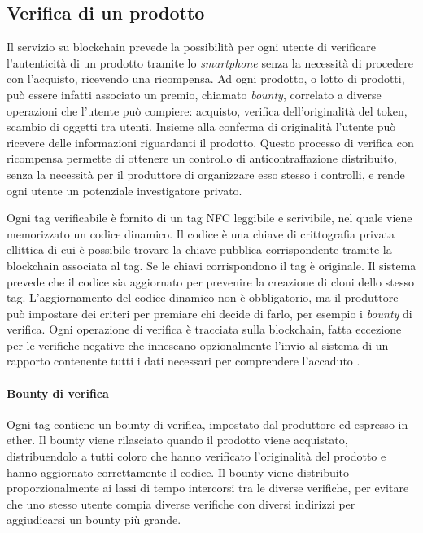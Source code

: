 \subsection{Verifica di un prodotto}
\label{verifica-di-un-prodotto}
Il servizio su blockchain prevede la possibilità per ogni utente di verificare l'autenticità di un prodotto tramite lo \emph{smartphone} senza la necessità di procedere con l'acquisto, ricevendo una ricompensa. Ad ogni prodotto, o lotto di prodotti, può essere infatti associato un premio, chiamato \emph{bounty}, correlato a diverse operazioni che l'utente può compiere: acquisto, verifica dell'originalità del token, scambio di oggetti tra utenti. Insieme alla conferma di originalità l'utente può ricevere delle informazioni riguardanti il prodotto. Questo processo di verifica con ricompensa permette di ottenere un controllo di anticontraffazione distribuito, senza la necessità per il produttore di organizzare esso stesso i controlli, e rende ogni utente un potenziale investigatore privato.

Ogni tag verificabile è fornito di un tag NFC leggibile e scrivibile, nel quale viene memorizzato un codice dinamico. Il codice è una chiave di crittografia privata ellittica di cui è possibile trovare la chiave pubblica corrispondente tramite la blockchain associata al tag. Se le chiavi corrispondono il tag è originale. Il sistema prevede che il codice sia aggiornato per prevenire la creazione di cloni dello stesso tag. L'aggiornamento del codice dinamico non è obbligatorio, ma il produttore può impostare dei criteri per premiare chi decide di farlo, per esempio i \emph{bounty} di verifica. Ogni operazione di verifica è tracciata sulla blockchain, fatta eccezione per le verifiche negative che innescano opzionalmente l'invio al sistema di un rapporto contenente tutti i dati necessari per comprendere l'accaduto \cite{bCerty-whitepaper}.

\paragraph{Bounty di verifica}
Ogni tag contiene un bounty di verifica, impostato dal produttore ed espresso in ether. Il bounty viene rilasciato quando il prodotto viene acquistato, distribuendolo a tutti coloro che hanno verificato l'originalità del prodotto e hanno aggiornato correttamente il codice. Il bounty viene distribuito proporzionalmente ai lassi di tempo intercorsi tra le diverse verifiche, per evitare che uno stesso utente compia diverse verifiche con diversi indirizzi per aggiudicarsi un bounty più grande.

